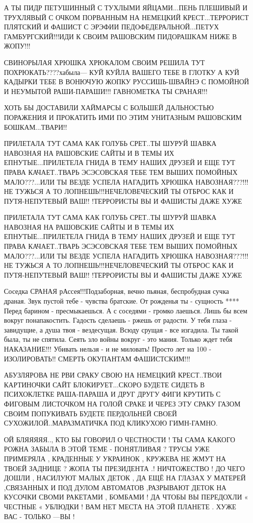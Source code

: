 А ТЫ ПИДР ПЕТУШИННЫЙ С ТУХЛЫМИ ЯЙЦАМИ...ПЕНЬ ПЛЕШИВЫЙ И ТРУХЛЯВЫЙ С ОЧКОМ
ПОРВАННЫМ НА НЕМЕЦКИЙ КРЕСТ...ТЕРРОРИСТ ПЛЯТСКИЙ И ФАШИСТ С ЭРЭФИИ
ПЕДОФЕДЕРАЛЬНОЙ...ПЕТУХ ГАМБУРГСКИЙ!!!ИДИ К СВОИМ РАШОВСКИМ ПИДОРАШКАМ НИЖЕ В
ЖОПУ!!!

СВИНОРЫЛАЯ ХРЮШКА ХРЮКАЛОМ СВОИМ РЕШИЛА ТУТ ПОХРЮКАТЬ????хабыла--- КУЙ КУЙЛА
ВАШЕГО ТЕБЕ В ГЛОТКУ А КУЙ КАДЫРКИ ТЕБЕ В ВОНЮЧУЮ ЖОПКУ РУССИШЬ-ШВАЙНЭ С
ПОМОЙНОЙ И НЕУМЫТОЙ РАШИ-ПАРАШИ!!! ГАВНОМЕТКА ТЫ СРАНАЯ!!!        

ХОТЬ БЫ ДОСТАВИЛИ ХАЙМАРСЫ С БОЛЬШЕЙ ДАЛЬНОСТЬЮ ПОРАЖЕНИЯ И ПРОКАТИТЬ ИМИ ПО
ЭТИМ УНИТАЗНЫМ РАШОВСКИМ БОШКАМ...ТВАРИ!!

ПРИЛЕТАЛА ТУТ САМА КАК ГОЛУБЬ СРЕТ..ТЫ ШУРУЙ ШАВКА НАВОЗНАЯ НА РАШОВСКИЕ САЙТЫ
И В ТЕМЫ ИХ ЕПНУТЫЕ...ПРИЛЕТЕЛА ГНИДА В ТЕМУ НАШИХ ДРУЗЕЙ И ЕЩЕ ТУТ ПРАВА
КАЧАЕТ..ТВАРЬ ЭСЭСОВСКАЯ ТЕБЕ ТЕМ ВЫШИХ ПОМОЙНЫХ МАЛО???...ИЛИ ТЫ ВЕЗДЕ УСПЕЛА
НАГАДИТЬ ХРЮШКА НАВОЗНАЯ???!!!НЕ ТУЖЬСЯ А ТО ЛОПНЕШЬ!!!НЕЧЕЛОВЕЧЕСКИЙ ТЫ ОТБРОС
КАК И ПУТЯ-НЕПУТЕВЫЙ ВАШ!! !ТЕРРОРИСТЫ ВЫ И ФАШИСТЫ ДАЖЕ ХУЖЕ                                             

ПРИЛЕТАЛА ТУТ САМА КАК ГОЛУБЬ СРЕТ..ТЫ ШУРУЙ ШАВКА НАВОЗНАЯ НА РАШОВСКИЕ САЙТЫ
И В ТЕМЫ ИХ ЕПНУТЫЕ...ПРИЛЕТЕЛА ГНИДА В ТЕМУ НАШИХ ДРУЗЕЙ И ЕЩЕ ТУТ ПРАВА
КАЧАЕТ..ТВАРЬ ЭСЭСОВСКАЯ ТЕБЕ ТЕМ ВЫШИХ ПОМОЙНЫХ МАЛО???...ИЛИ ТЫ ВЕЗДЕ УСПЕЛА
НАГАДИТЬ ХРЮШКА НАВОЗНАЯ???!!!НЕ ТУЖЬСЯ А ТО ЛОПНЕШЬ!!!НЕЧЕЛОВЕЧЕСКИЙ ТЫ ОТБРОС
КАК И ПУТЯ-НЕПУТЕВЫЙ ВАШ!! !ТЕРРОРИСТЫ ВЫ И ФАШИСТЫ ДАЖЕ ХУЖЕ                                                             

Соседка СРАНАЯ рАссея!!!Подзаборная, вечно пьяная, беспробудная сучка драная.
Звук пустой тебе - чувства братские. От рожденья ты - сущность **** Перед
барином - пресмыкаешься. А с соседями - громко лаешься. Лишь бы всем вокруг
понапакостить. Гадость сделаешь - ржешь от радости. У тебя глаза - завидущие, а
душа твоя - вездесущая. Всюду срущая - все изгадила. Ты такой была, ты не
спятила. Сеять зло войны вокруг - это мания. Только ждет тебя НАКАЗАНИЕ!!!
Убивать нельзя - и не миловать! Просто лет на 100 - ИЗОЛИРОВАТЬ!! СМЕРТЬ
ОКУПАНТАМ ФАШИСТСКИМ!!!

АБУЗЛЯРОВА НЕ РВИ СРАКУ СВОЮ НА НЕМЕЦКИЙ КРЕСТ..ТВОИ КАРТИНОЧКИ САЙТ
БЛОКИРУЕТ...СКОРО БУДЕТЕ СИДЕТЬ В ПСИХОКЛЕТКЕ РАША-ПАРАША И ДРУГ ДРУГУ ФИГИ
КРУТИТЬ С ФИГОВЫМ ЛИСТОЧКОМ НА  ГОЛОЙ СРАКЕ И ЧЕРЕЗ ЭТУ СРАКУ ГАЗОМ СВОИМ
ПОПУКИВАТЬ БУДЕТЕ ПЕРДОЛЬНЕЙ СВОЕЙ СУХОЖИЛОЙ..МАРАЗМАТИЧКА ПОД КЛИКУХОЮ
ГИМН-ГАМНО.

ОЙ БЛЯЯЯЯЯ.., КТО БЫ ГОВОРИЛ О ЧЕСТНОСТИ ! ТЫ САМА КАКОГО РОЖНА ЗАБЫЛА В ЭТОЙ
ТЕМЕ - ПОНЯТЛИВАЯ ? ТРУСЫ УЖЕ ПРИМЕРЯЛА , КРАДЕННЫЕ У УКРАИНОК , КРУЖЕВА НЕ
ЖМУТ НА ТВОЕЙ ЗАДНИЦЕ ? ЖОПА ТЫ ПРЕЗИДЕНТА .! НИЧТОЖЕСТВО ! ДО ЧЕГО ДОШЛИ ,
НАСИЛУЮТ МАЛЫХ ДЕТОК , ДА ЕЩЁ НА ГЛАЗАХ У МАТЕРЕЙ ,СВЯЗАННЫХ И ПОД ДУЛОМ
АВТОМАТОВ ,РАЗРЫВАЮТ ДЕТОК НА КУСОЧКИ СВОМИ РАКЕТАМИ , БОМБАМИ ! ДА ЧТОБЫ ВЫ
ПЕРЕДОХЛИ « ЧЕСТНЫЕ « УБЛЮДКИ ! ВАМ НЕТ МЕСТА НА ЭТОЙ ПЛАНЕТЕ . ХУЖЕ ВАС -
ТОЛЬКО —ВЫ !

